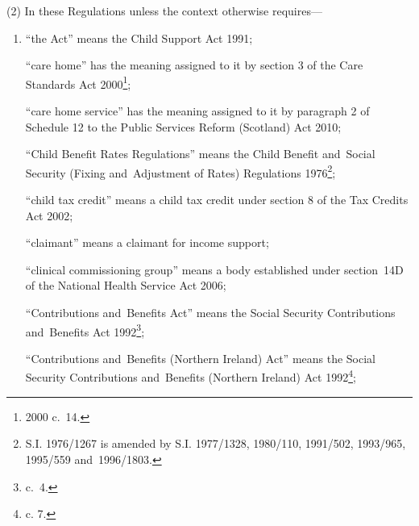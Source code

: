 \documentclass[12pt,a4paper]{article}
\begin{document}
(2) In these Regulations unless the context otherwise requires—
\begin{enumerate}\item[]
“the Act” means the Child Support Act 1991;

“care home” has the meaning assigned to it by section 3 of the Care Standards Act 2000\footnote{2000 c.\ 14.};


“care home service” has the meaning assigned to it by paragraph 2 of Schedule 12 to the Public Services Reform (Scotland) Act 2010;

“Child Benefit Rates Regulations” means the Child Benefit and~Social Security (Fixing and~Adjustment of Rates) Regulations 1976\footnote{\frenchspacing S.I. 1976/1267 is amended by S.I. 1977/1328, 1980/110, 1991/502, 1993/965, 1995/559 and~1996/1803.};

“child tax credit” means a child tax credit under section 8 of the Tax Credits Act 2002;

“claimant” means a claimant for income support;

“clinical commissioning group” means a body established under section~14D of the National Health Service Act 2006;

“Contributions and~Benefits Act” means the Social Security Contributions and~Benefits Act 1992\footnote{ c.~4.};

“Contributions and~Benefits (Northern Ireland) Act” means the Social Security Contributions and~Benefits (Northern Ireland) Act 1992\footnote{ c. 7.};



\end{enumerate}
\end{document}
